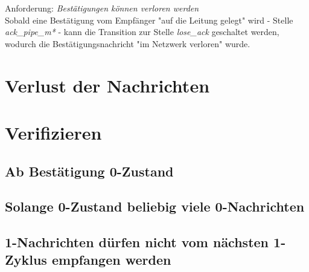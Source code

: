 \documentclass[]{scrartcl}
\begin{document}
Anforderung: \textit{Bestätigungen können verloren werden} \\
Sobald eine Bestätigung vom Empfänger "auf die Leitung gelegt" wird - Stelle \textit{ack\_pipe\_m*} - kann die Transition zur Stelle \textit{lose\_ack} geschaltet werden, wodurch die Bestätigungsnachricht "im Netzwerk verloren" wurde.

\section{Verlust der Nachrichten}

\section{Verifizieren}
\subsection{Ab Bestätigung 0-Zustand}
\subsection{Solange 0-Zustand beliebig viele 0-Nachrichten}
\subsection{1-Nachrichten dürfen nicht vom nächsten 1-Zyklus empfangen werden}
\end{document}
